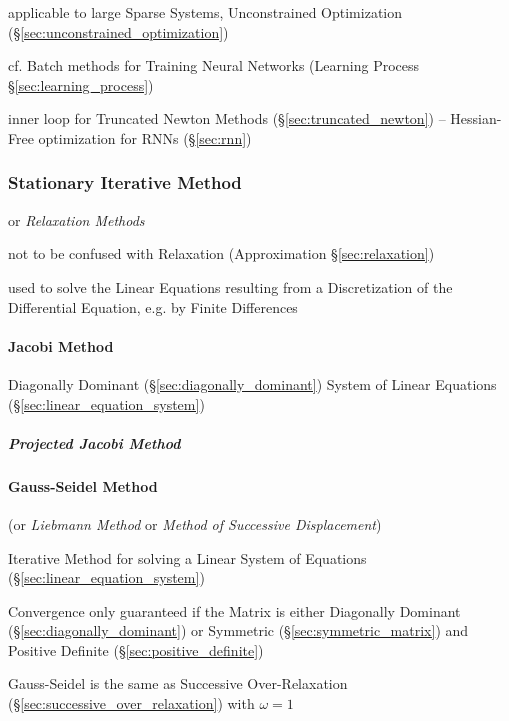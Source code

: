 applicable to large Sparse Systems, Unconstrained Optimization
(\S\ref{sec:unconstrained_optimization})

\fist cf. Batch methods for Training Neural Networks (Learning Process
\S\ref{sec:learning_process})

inner loop for Truncated Newton Methods (\S\ref{sec:truncated_newton}) --
Hessian-Free optimization for RNNs (\S\ref{sec:rnn})



\subsubsection{Stationary Iterative Method}
\label{sec:stationary_iterative}

or \emph{Relaxation Methods}

\fist not to be confused with Relaxation (Approximation \S\ref{sec:relaxation})

used to solve the Linear Equations resulting from a Discretization of the
Differential Equation, e.g. by Finite Differences



\paragraph{Jacobi Method}\label{sec:jacobi_method}\hfill

Diagonally Dominant (\S\ref{sec:diagonally_dominant}) System of Linear
Equations (\S\ref{sec:linear_equation_system})



\subparagraph{Projected Jacobi Method}
\label{sec:projected_jacobi_method}



\paragraph{Gauss-Seidel Method}\label{sec:gauss_seidel}\hfill

(or \emph{Liebmann Method} or \emph{Method of Successive
  Displacement})

Iterative Method for solving a Linear System of Equations
(\S\ref{sec:linear_equation_system})

Convergence only guaranteed if the Matrix is either Diagonally
Dominant (\S\ref{sec:diagonally_dominant}) or Symmetric
(\S\ref{sec:symmetric_matrix}) and Positive Definite
(\S\ref{sec:positive_definite})

Gauss-Seidel is the same as Successive Over-Relaxation
(\S\ref{sec:successive_over_relaxation}) with $\omega = 1$



